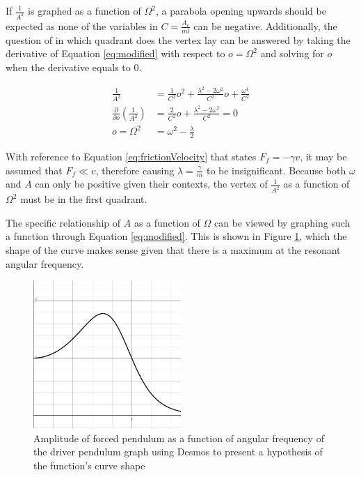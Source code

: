 \documentclass[letterpaper, 12pt]{article}
\begin{document}
If \(\frac{1}{A^2}\) is graphed as a function of \(\Omega^2\),
a parabola opening upwards should be expected as
none of the variables in
\(C = \frac{A_e}{ml}\) can be negative. Additionally,
the question of in which quadrant does the vertex lay can
be answered by taking the derivative of Equation \ref*{eq:modified}
with respect to \(o = \Omega^2\) and solving for \(o\) when
the derivative equals to 0.

\begin{align*}
    \frac{1}{A^2}                                           & = \frac{1}{C^2}o^2+ \frac{\lambda^2 - 2\omega^2}{C^2}o + \frac{\omega^4}{C^2}
    \\
    \frac{\partial}{\partial o}\left( \frac{1}{A^2} \right) & = \frac{2}{C^2}o + \frac{\lambda^2 - 2\omega^2}{C^2} = 0
    \\
    o = \Omega^2                                            & = \omega^2 - \frac{\lambda}{2}
\end{align*}

With reference to Equation \ref*{eq:frictionVelocity} that states
\(F_f = -\gamma v\), it may be assumed that \(F_f \ll v\),
therefore causing \(\lambda = \frac{\gamma}{m}\) to be
insignificant. Because both \(\omega\) and \(A\) can only
be positive given their contexts, the vertex of
\(\frac{1}{A^2}\) as a function of \(\Omega^2\)
must be in the first quadrant.

The specific relationship of \(A\) as a function of \(\Omega\)
can be viewed by graphing such a function through
Equation \ref*{eq:modified}. This is shown in Figure
\ref*{fig:hypothesis}, which the shape of the curve
makes sense given that there is a maximum
at the resonant angular frequency.

\begin{figure}[H]
    \centering
    \includegraphics[width=0.5\textwidth]{hypothesis.png}
    \caption{Amplitude of forced pendulum as a function of angular frequency of the driver pendulum graph using Desmos to present a hypothesis of the function's curve shape}
    \label{fig:hypothesis}
\end{figure}
\end{document}
